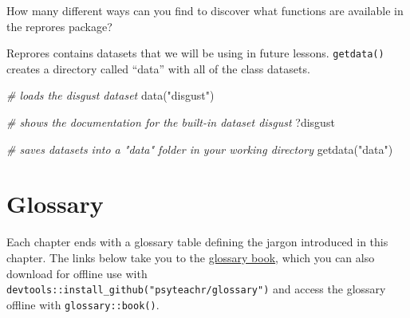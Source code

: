 \documentclass[
  oneside]{book}
\newenvironment{Shaded}{\begin{snugshade}}{\end{snugshade}}
\newcommand{\CommentTok}[1]{\textcolor[rgb]{0.56,0.35,0.01}{\textit{#1}}}
\newcommand{\FunctionTok}[1]{\textcolor[rgb]{0.00,0.00,0.00}{#1}}
\newcommand{\NormalTok}[1]{#1}
\newcommand{\StringTok}[1]{\textcolor[rgb]{0.31,0.60,0.02}{#1}}
\begin{document}
\begin{try}
How many different ways can you find to discover what functions are available in the reprores package?

\end{try}

Reprores contains datasets that we will be using in future lessons. \texttt{getdata()} creates a directory called ``data'' with all of the class datasets.

\begin{Shaded}
\begin{Highlighting}[]
\CommentTok{\# loads the disgust dataset}
\FunctionTok{data}\NormalTok{(}\StringTok{"disgust"}\NormalTok{)}

\CommentTok{\# shows the documentation for the built{-}in dataset \textasciigrave{}disgust\textasciigrave{}}
\NormalTok{?disgust}

\CommentTok{\# saves datasets into a "data" folder in your working directory}
\FunctionTok{getdata}\NormalTok{(}\StringTok{"data"}\NormalTok{)}
\end{Highlighting}
\end{Shaded}

\hypertarget{glossaryintro}{%
\section{Glossary}\label{glossaryintro}}

Each chapter ends with a glossary table defining the jargon introduced in this chapter. The links below take you to the \href{https://psyteachr.github.io/glossary}{glossary book}, which you can also download for offline use with \texttt{devtools::install\_github("psyteachr/glossary")} and access the glossary offline with \texttt{glossary::book()}.
\end{document}

